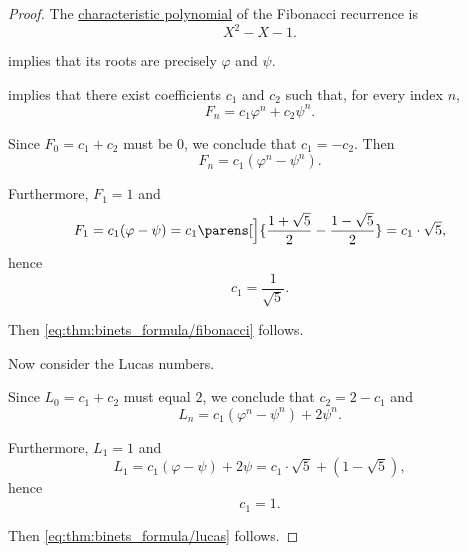 \begin{proof}
  The \hyperref[def:linear_recurrence_characteristic_polynomial]{characteristic polynomial} of the Fibonacci recurrence is
  \begin{equation*}
    X^2 - X - 1.
  \end{equation*}

   implies that its roots are precisely \( \varphi \) and \( \psi \).

    implies that there exist coefficients \( c_1 \) and \( c_2 \) such that, for every index \( n \),
  \begin{equation*}
    F_n = c_1 \varphi^n + c_2 \psi^n.
  \end{equation*}

  Since \( F_0 = c_1 + c_2 \) must be \( 0 \), we conclude that \( c_1 = -c_2 \). Then
  \begin{equation*}
    F_n = c_1 (\varphi^n - \psi^n).
  \end{equation*}

  Furthermore, \( F_1 = 1 \) and
  \begin{equation*}
    F_1 = c_1 (\varphi - \psi) = c_1 \parens[\Big]{ \frac {1 + \sqrt 5} 2 - \frac {1 - \sqrt 5} 2 } = c_1 \cdot \sqrt 5,
  \end{equation*}
  hence
  \begin{equation*}
    c_1 = \frac 1 {\sqrt 5}.
  \end{equation*}

  Then \eqref{eq:thm:binets_formula/fibonacci} follows.

   Now consider the Lucas numbers.

  Since \( L_0 = c_1 + c_2 \) must equal \( 2 \), we conclude that \( c_2 = 2 - c_1 \) and
  \begin{equation*}
    L_n = c_1 (\varphi^n - \psi^n) + 2 \psi^n.
  \end{equation*}

  Furthermore, \( L_1 = 1 \) and
  \begin{equation*}
    L_1 = c_1 (\varphi - \psi) + 2 \psi = c_1 \cdot \sqrt 5 + (1 - \sqrt 5),
  \end{equation*}
  hence
  \begin{equation*}
    c_1 = 1.
  \end{equation*}

  Then \eqref{eq:thm:binets_formula/lucas} follows.
\end{proof}

